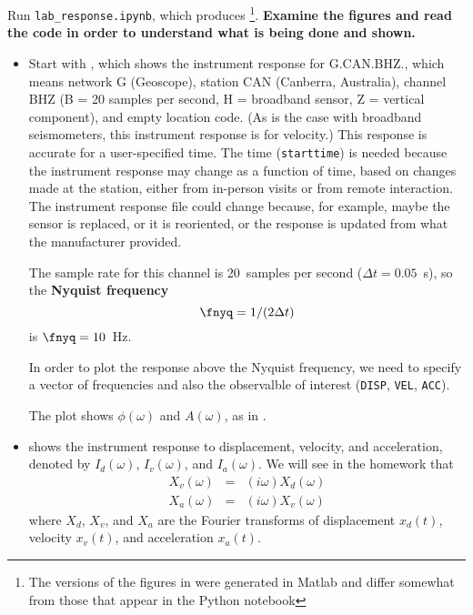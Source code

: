 \documentclass[11pt,titlepage,fleqn]{article}
\newcommand{\tfile}{{\tt lab\_response.ipynb}}
\begin{document}
Run \tfile, which produces \footnote{The versions of the figures in  were generated in Matlab and differ somewhat from those that appear in the Python notebook}. {\bf Examine the figures and read the code in order to understand what is being done and shown.}
%
\begin{itemize}
\item Start with , which shows the instrument response for G.CAN.BHZ., which means network G (Geoscope), station CAN (Canberra, Australia), channel BHZ (B = 20 samples per second, H = broadband sensor, Z = vertical component), and empty location code. (As is the case with broadband seismometers, this instrument response is for velocity.) This response is accurate for a user-specified time. The time (\verb+starttime+) is needed because the instrument response may change as a function of time, based on changes made at the station, either from in-person visits or from remote interaction. The instrument response file could change because, for example, maybe the sensor is replaced, or it is reoriented, or the response is updated from what the manufacturer provided.
%
%

The sample rate for this channel is 20~samples per second ($\Delta t = 0.05$~s), so the {\bf Nyquist frequency}
%
\begin{equation}
\fnyq = 1/(2\Delta t)
\end{equation}
%
is $\fnyq = 10$~Hz.

In order to plot the response above the Nyquist frequency, we need to specify a vector of frequencies and also the observalble of interest (\verb+DISP+, \verb+VEL+, \verb+ACC+).

The plot shows $\phi(\omega)$ and $A(\omega)$, as in .


\item {} shows the instrument response to displacement, velocity, and acceleration, denoted by $I_d(\omega)$, $I_v(\omega)$, and $I_a(\omega)$. We will see in the homework that 
%
\begin{eqnarray*}
X_v(\omega) &=& (i\omega) X_d(\omega)
\\
X_a(\omega) &=& (i\omega) X_v(\omega)
\end{eqnarray*}
%
where $X_d$, $X_v$, and $X_a$ are the Fourier transforms of displacement $x_d(t)$, velocity $x_v(t)$, and acceleration $x_a(t)$.


\end{itemize}
\end{document}
